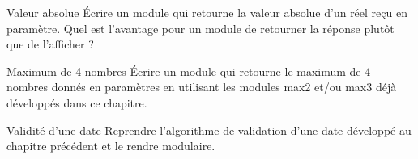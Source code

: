\begin{Exercice}{Valeur absolue}
Écrire un module qui retourne la valeur absolue d'un
réel reçu en paramètre.
Quel est l'avantage pour un module de retourner la réponse 
plutôt que de l'afficher ?
\end{Exercice}

\begin{Exercice}{Maximum de 4 nombres}
Écrire un module qui retourne le maximum de 4
nombres donnés en paramètres en utilisant les modules
max2 et/ou max3 déjà développés dans ce chapitre.
\end{Exercice}

\begin{Exercice}{Validité d'une date}
Reprendre l'algorithme de validation d'une date 
développé au chapitre précédent et le rendre modulaire.
\end{Exercice}


